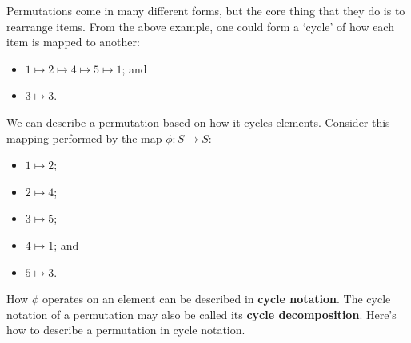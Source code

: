 Permutations come in many different forms, but the core thing that they do is to rearrange items. From the above example, one could form a `cycle' of how each item is mapped to another:
\begin{itemize}
    \item $1 \mapsto 2 \mapsto 4 \mapsto 5 \mapsto 1$; and
    \item $3 \mapsto 3$.
\end{itemize}
We can describe a permutation based on how it cycles elements. Consider this mapping performed by the map $\phi: S \to S$:
\begin{itemize}
    \item $1 \mapsto 2$;
    \item $2 \mapsto 4$;
    \item $3 \mapsto 5$;
    \item $4 \mapsto 1$; and
    \item $5 \mapsto 3$.
\end{itemize}
How $\phi$ operates on an element can be described in \textbf{cycle notation}. The cycle notation of a permutation may also be called its \textbf{cycle decomposition}. Here's how to describe a permutation in cycle notation.
